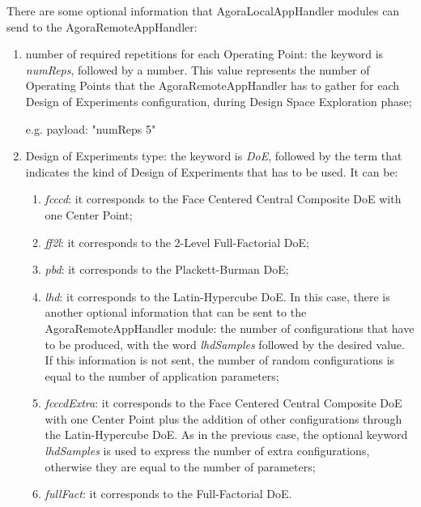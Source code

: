 There are some optional information that AgoraLocalAppHandler modules can send to the AgoraRemoteAppHandler:

\begin{enumerate}

    \item number of required repetitions for each Operating Point: the keyword is \textit{numReps}, followed by a number. This value represents the number of Operating Points that the AgoraRemoteAppHandler has to gather for each Design of Experiments configuration, during Design Space Exploration phase;
    
    e.g. payload: "numReps 5"
    
    \item Design of Experiments type: the keyword is \textit{DoE}, followed by the term that indicates the kind of Design of Experiments that has to be used. It can be:
    
    \begin{enumerate}
    
        \item \textit{fcccd}: it corresponds to the Face Centered Central Composite DoE with one Center Point;
        
        \item \textit{ff2l}: it corresponds to the 2-Level Full-Factorial DoE;
        
        \item \textit{pbd}: it corresponds to the Plackett-Burman DoE;
        
        \item \textit{lhd}: it corresponds to the Latin-Hypercube DoE. In this case, there is another optional information that can be sent to the AgoraRemoteAppHandler module: the number of configurations that have to be produced, with the word \textit{lhdSamples} followed by the desired value. If this information is not sent, the number of random configurations is equal to the number of application parameters;
        
        \item \textit{fcccdExtra}: it corresponds to the Face Centered Central Composite DoE with one Center Point plus the addition of other configurations through the Latin-Hypercube DoE. As in the previous case, the optional keyword \textit{lhdSamples} is used to express the number of extra configurations, otherwise they are equal to the number of parameters;
        
        \item \textit{fullFact}: it corresponds to the Full-Factorial DoE.
    

\end{enumerate}
\end{enumerate}
